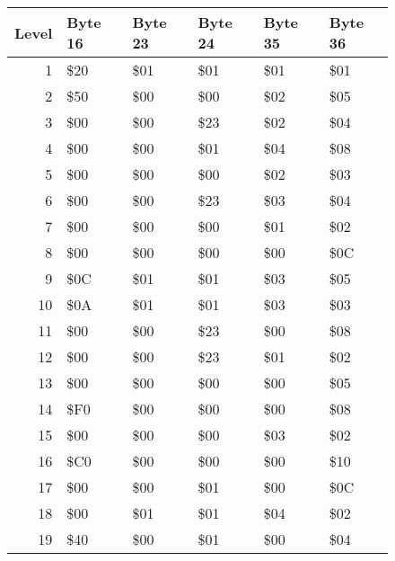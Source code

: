 \begin{figure}[H]
  {
  \setlength{\tabcolsep}{3.0pt}
  \setlength\cmidrulewidth{\heavyrulewidth} %
  \begin{adjustbox}{width=\textwidth}

\begin{tabular}{rlllll}
\toprule
   Level & Byte 16   & Byte 23   & Byte 24   & Byte 35   & Byte 36   \\
\midrule
       1 & \$20       & \$01       & \$01       & \$01       & \$01       \\
       2 & \$50       & \$00       & \$00       & \$02       & \$05       \\
       3 & \$00       & \$00       & \$23       & \$02       & \$04       \\
       4 & \$00       & \$00       & \$01       & \$04       & \$08       \\
       5 & \$00       & \$00       & \$00       & \$02       & \$03       \\
       6 & \$00       & \$00       & \$23       & \$03       & \$04       \\
       7 & \$00       & \$00       & \$00       & \$01       & \$02       \\
       8 & \$00       & \$00       & \$00       & \$00       & \$0C       \\
       9 & \$0C       & \$01       & \$01       & \$03       & \$05       \\
      10 & \$0A       & \$01       & \$01       & \$03       & \$03       \\
      11 & \$00       & \$00       & \$23       & \$00       & \$08       \\
      12 & \$00       & \$00       & \$23       & \$01       & \$02       \\
      13 & \$00       & \$00       & \$00       & \$00       & \$05       \\
      14 & \$F0       & \$00       & \$00       & \$00       & \$08       \\
      15 & \$00       & \$00       & \$00       & \$03       & \$02       \\
      16 & \$C0       & \$00       & \$00       & \$00       & \$10       \\
      17 & \$00       & \$00       & \$01       & \$00       & \$0C       \\
      18 & \$00       & \$01       & \$01       & \$04       & \$02       \\
      19 & \$40       & \$00       & \$01       & \$00       & \$04       \\

\end{tabular}
\end{adjustbox}}
\end{figure}
